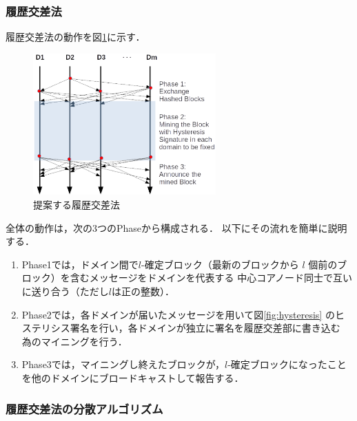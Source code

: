 \documentclass[a4paper,12pt]{jsarticle}
\begin{document}
      \subsubsection{履歴交差法}
履歴交差法の動作を図\ref{fig:cross-ref}に示す．
%
\begin{figure}[tbh]
  \begin{center}
    \includegraphics[width=70mm]{pht/time_sequence-algorithm1.eps}
  \end{center}
  \caption{提案する履歴交差法}
  \label{fig:cross-ref}
\end{figure}
%
全体の動作は，次の3つのPhaseから構成される．
以下にその流れを簡単に説明する．

\hspace{5mm}
%
\begin{enumerate}
\item Phase1では，ドメイン間で$l$-確定ブロック（最新のブロックから 
      $l$ 個前のブロック）を含むメッセージをドメインを代表する
      中心コアノード同士で互いに送り合う（ただし$l$は正の整数）．

\item Phase2では，各ドメインが届いたメッセージを用いて図\ref{fig:hysteresis}
      のヒステリシス署名を行い，各ドメインが独立に署名を履歴交差部に書き込む
      為のマイニングを行う．

\item Phase3では，マイニングし終えたブロックが，$l$-確定ブロックになったこと
      を他のドメインにブロードキャストして報告する．
\end{enumerate}
%
\hspace{5mm}

      \subsubsection{履歴交差法の分散アルゴリズム}
\end{document}
